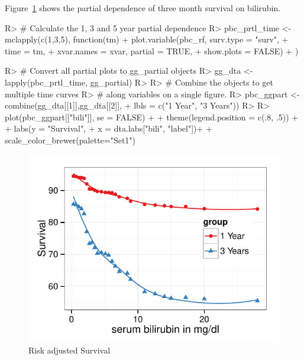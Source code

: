 \documentclass[nojss]{jss}\usepackage[]{graphicx}\usepackage[]{color}
\makeatletter
\def\maxwidth{ %
  \ifdim\Gin@nat@width>\linewidth
    \linewidth
  \else
    \Gin@nat@width
  \fi
}
\makeatother
\begin{document}
Figure~\ref{fig:pbc-partial-bili} shows the partial dependence of three month survival on bilirubin. 

\begin{Schunk}
\begin{Sinput}
R> # Calculate the 1, 3 and 5 year partial dependence
R> pbc_prtl_time <- mclapply(c(1,3,5), function(tm){
+   plot.variable(pbc_rf, surv.type = "surv", 
+                           time = tm, 
+                           xvar.names = xvar, partial = TRUE, 
+                           show.plots = FALSE)
+ })
\end{Sinput}
\end{Schunk}




\begin{Schunk}
\begin{Sinput}
R> # Convert all partial plots to gg_partial objects
R> gg_dta <- lapply(pbc_prtl_time, gg_partial)
R> 
R> # Combine the objects to get multiple time curves 
R> # along variables on a single figure.
R> pbc_ggpart <- combine(gg_dta[[1]],gg_dta[[2]], 
+                       lbls = c("1 Year", "3 Years"))
R> 
R> plot(pbc_ggpart[["bili"]], se = FALSE) + 
+   theme(legend.position = c(.8, .5)) + 
+   labs(y = "Survival", 
+        x = dta.labs["bili", "label"])+
+   scale_color_brewer(palette="Set1")
\end{Sinput}
\begin{figure}[!htpb]

{\centering \includegraphics[width=\maxwidth]{figure/rfs-pbc-partial-bili-1} 

}

\caption[Risk adjusted Survival]{Risk adjusted Survival\label{fig:pbc-partial-bili}}
\end{figure}
\end{Schunk}
\end{document}
